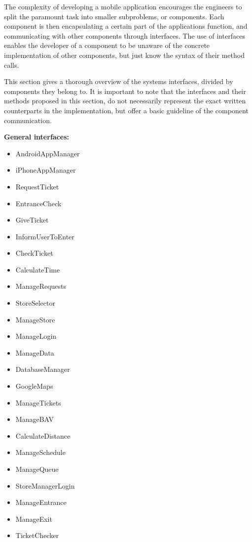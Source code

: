 \hspace{\parindent}The complexity of developing a mobile application encourages the engineers to split the paramount task into smaller subproblems, or components. Each component is then encapsulating a certain part of the applications function, and communicating with other components through interfaces. The use of interfaces enables the developer of a component to be unaware of the concrete implementation of other components, but just know the syntax of their method calls. 

This section gives a thorough overview of the systems interfaces, divided by components they belong to. It is important to note that the interfaces and their methods proposed in this section, do not necessarily represent the exact written counterparts in the implementation, but offer a basic guideline of the component communication. \newline

\textbf{General interfaces: }
\begin{itemize}
\item AndroidAppManager
\item iPhoneAppManager 
\item RequestTicket 
\item EntranceCheck 
\item GiveTicket 
\item InformUserToEnter 
\item CheckTicket 
\item CalculateTime 
\item ManageRequests 
\item StoreSelector 
\item ManageStore 
\item ManageLogin 
\item ManageData 
\item DatabaseManager 
\item GoogleMaps 
\item ManageTickets 
\item ManageBAV 
\item CalculateDistance 
\item ManageSchedule 
\item ManageQueue 
\item StoreManagerLogin 
\item ManageEntrance 
\item ManageExit 
\item TicketChecker 
\end{itemize}

